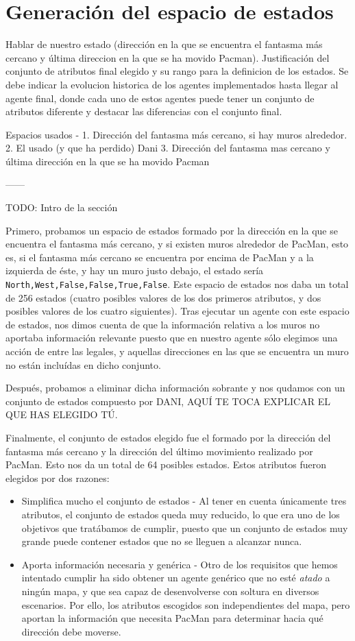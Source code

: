 \documentclass[12pt]{article}
\begin{document}
\section{Generación del espacio de estados}
Hablar de nuestro estado (dirección en la que se encuentra el fantasma más cercano y última direccion en la que se ha movido Pacman).
Justificación del conjunto de atributos final elegido y su rango para la definicion de los estados. Se debe indicar la evolucion historica de los agentes implementados hasta llegar al agente final, donde cada uno de estos agentes puede tener un conjunto de atributos diferente y destacar las diferencias con el conjunto final.

Espacios usados -
1. Dirección del fantasma más cercano, si hay muros alrededor.
2. El usado (y que ha perdido) Dani
3. Dirección del fantasma mas cercano y última dirección en la que se ha movido Pacman

------

TODO: Intro de la sección

Primero, probamos un espacio de estados formado por la dirección en la que se encuentra el fantasma más cercano, y si existen muros alrededor de PacMan, esto es, si el fantasma más cercano se encuentra por encima de PacMan y a la izquierda de éste, y hay un muro justo debajo, el estado sería \texttt{North,West,False,False,True,False}. Este espacio de estados nos daba un total de 256 estados (cuatro posibles valores de los dos primeros atributos, y dos posibles valores de los cuatro siguientes).
Tras ejecutar un agente con este espacio de estados, nos dimos cuenta de que la información relativa a los muros no aportaba información relevante puesto que en nuestro agente sólo elegimos una acción de entre las legales, y aquellas direcciones en las que se encuentra un muro no están incluídas en dicho conjunto.

Después, probamos a eliminar dicha información sobrante y nos qudamos con un conjunto de estados compuesto por DANI, AQUÍ TE TOCA EXPLICAR EL QUE HAS ELEGIDO TÚ.

Finalmente, el conjunto de estados elegido fue el formado por la dirección del fantasma más cercano y la dirección del último movimiento realizado por PacMan. Esto nos da un total de 64 posibles estados. Estos atributos fueron elegidos por dos razones:
\begin{itemize}
	\item Simplifica mucho el conjunto de estados - Al tener en cuenta únicamente tres atributos, el conjunto de estados queda muy reducido, lo que era uno de los objetivos que tratábamos de cumplir, puesto que un conjunto de estados muy grande puede contener estados que no se lleguen a alcanzar nunca.
	\item Aporta información necesaria y genérica - Otro de los requisitos que hemos intentado cumplir ha sido obtener un agente genérico que no esté \textit{atado} a ningún mapa, y que sea capaz de desenvolverse con soltura en diversos escenarios. Por ello, los atributos escogidos son independientes del mapa, pero aportan la información que necesita PacMan para determinar hacia qué dirección debe moverse.
\end{itemize}
\end{document}
